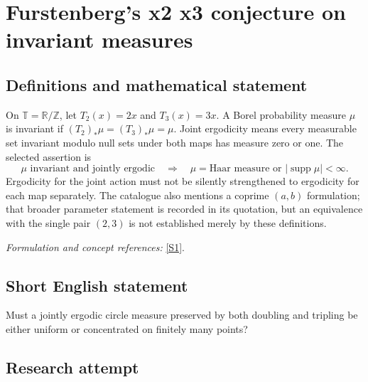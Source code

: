 \documentclass[11pt,a4paper]{article}
\newcommand{\Z}{\mathbb{Z}}
\newcommand{\R}{\mathbb{R}}
\newcommand{\sref}[2]{\hyperlink{source:#1:#2}{[S#2]}}
\newif\ifshowcatalogue
\newcommand{\cataloguescope}[1]{\ifshowcatalogue
 \paragraph{Exact scope in the supplied catalogue.}
 \begin{quote}\small #1\end{quote}\fi}
\numberwithin{equation}{section}
\begin{document}
\setcounter{section}{0}
\clearpage
\section*{\texorpdfstring{Furstenberg's x2 x3 conjecture on invariant measures}{Furstenberg's x2 x3 conjecture on invariant measures}}\label{statement}
\subsection{Definitions and mathematical statement}
On $\mathbb T=\R/\Z$, let $T_2(x)=2x$ and $T_3(x)=3x$. A Borel probability measure $\mu$ is invariant if $(T_2)_*\mu=(T_3)_*\mu=\mu$. Joint ergodicity means every measurable set invariant modulo null sets under both maps has measure zero or one. The selected assertion is
\[
 \mu\text{ invariant and jointly ergodic}
 \quad\Longrightarrow\quad
 \mu=\text{Haar measure or }|\operatorname{supp}\mu|<\infty.
\]
Ergodicity for the joint action must not be silently strengthened to ergodicity for each map separately. The catalogue also mentions a coprime $(a,b)$ formulation; that broader parameter statement is recorded in its quotation, but an equivalence with the single pair $(2,3)$ is not established merely by these definitions.
\par\smallskip\textit{Formulation and concept references:} \sref{statement}{1}.
\cataloguescope{Prove that every ergodic probability measure on the unit circle T that is invariant under both maps x -> 2x mod 1 and x -> 3x mod 1 is either the Lebesgue measure or supported on a finite set (equivalently, for coprime a,b >= 2, every ergodic x(a,b)-invariant measure is Lebesgue or finitely supported).}
\subsection{Short English statement}
Must a jointly ergodic circle measure preserved by both doubling and tripling be either uniform or concentrated on finitely many points?
\subsection{Research attempt}
\end{document}
